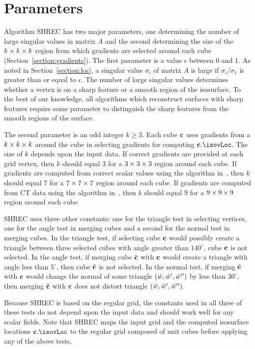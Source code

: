 \section{Parameters}
\label{section:parameters}

Algorithm SHREC has two major parameters,
one determining the number of large singular values in matrix $A$
and the second determining the size of the $k \times k \times k$ region 
from which gradients are selected around each cube
(Section~\ref{section:gradients}).
The first parameter is a value $\epsilon$ between 0 and 1.
As noted in Section~\ref{section:loc},
a singular value $\sigma_i$ of matrix $A$ 
is large if $\sigma_i/\sigma_1$ is greater than or equal to $\epsilon$.
The number of large singular values determines whether a vertex
is on a sharp feature or a smooth region of the isosurface.
To the best of our knowledge, all algorithms which reconstruct surfaces 
with sharp features require some parameter
to distinguish the sharp features from the smooth regions of the surface.

The second parameter is an odd integer $k \ge 3$.
Each cube $\mathbf{c}$ uses gradients from a $k \times k \times k$ around the cube
in selecting gradients for computing $\cb.\isovLoc$.
The size of $k$ depends upon the input data.
If correct gradients are provided at each grid vertex,
then $k$ should equal 3 for a $3 \times 3 \times 3$ region around each cube.
If gradients are computed from correct scalar values 
using the algorithm in~\cite{bw-isifsd-15},
then $k$ should equal 7 for a $7 \times 7 \times 7$ region around each cube.
If gradients are computed from CT data 
using the algorithm in~\cite{bw-isifsd-15},
then $k$ should equal 9 for a $9 \times 9 \times 9$ region around each cube.

SHREC uses three other constants:
one for the triangle test in selecting vertices,
one for the angle test in merging cubes
and a second for the normal test in merging cubes.
In the triangle test,
if selecting cube $\mathbf{c}$ would possibly create a triangle between three
selected cubes with angle greater than $140^\circ$, 
cube $\mathbf{c}$ is not selected.
In the angle test,
if merging cube ${\tilde{\mathbf{c}}}$ with $\mathbf{c}$ would create a triangle with angle
less than $5^\circ$, then cube ${\tilde{\mathbf{c}}}$ is not selected.
In the normal test,
if merging ${\tilde{\mathbf{c}}}$ with $\mathbf{c}$ would change the normal 
of some triangle $(\tilde{w},\tilde{w}',\tilde{w}'')$ by less than $30^\circ$,
then merging ${\tilde{\mathbf{c}}}$ with $\mathbf{c}$ does not distort triangle $(\tilde{w},\tilde{w}',\tilde{w}'')$.

Because SHREC is based on the regular grid,
the constants used in all three of these tests do not depend 
upon the input data and should work well for any scalar fields.
Note that SHREC maps the input grid 
and the computed isosurface locations $\cb.\isovLoc$
to the regular grid composed of unit cubes
before applying any of the above tests.
